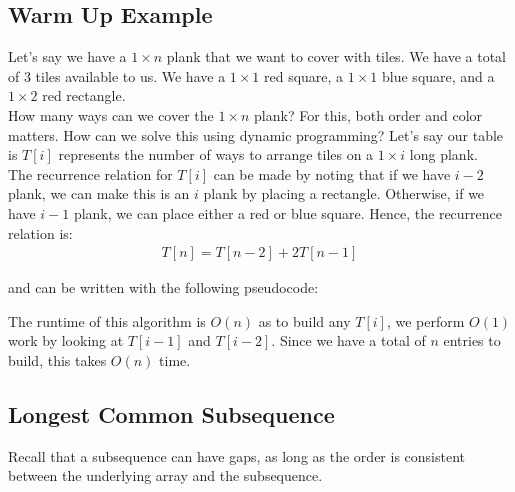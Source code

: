 \documentclass[14pt]{extarticle}
\begin{document}
	\MakeScribeTop

    \subsection*{Warm Up Example}
    Let's say we have a $1\times n$ plank that we want to cover with tiles. We
    have a total of 3 tiles available to us. We have a $1\times 1$ red
    square, a $1\times 1$ blue square, and a $1\times 2$ red rectangle.\\

    How many ways can we cover the $1\times n$ plank? For this, both order
    and color matters. How can we solve this using dynamic programming? Let's
    say our table is $T[i]$ represents the number of ways to arrange tiles on a
    $1\times i$ long plank.\\

    The recurrence relation for $T[i]$ can be made by noting that if we have
    $i-2$ plank, we can make this is an $i$ plank by placing a rectangle.
    Otherwise, if we have $i - 1$ plank, we can place either a red or blue
    square. Hence, the recurrence relation is:
    \begin{align*}
        T[n] = T[n-2] + 2T[n-1]
    \end{align*}

    and can be written with the following pseudocode:\\
    \begin{algorithm}[H]
    \end{algorithm}

    The runtime of this algorithm is $O(n)$ as to build any $T[i]$, we perform
    $O(1)$ work by looking at $T[i-1]$ and $T[i-2]$. Since we have a total of
    $n$ entries to build, this takes $O(n)$ time.

    \subsection*{Longest Common Subsequence}
    Recall that a subsequence can have gaps, as long as the order is consistent
    between the underlying array and the subsequence.\\
\end{document}
